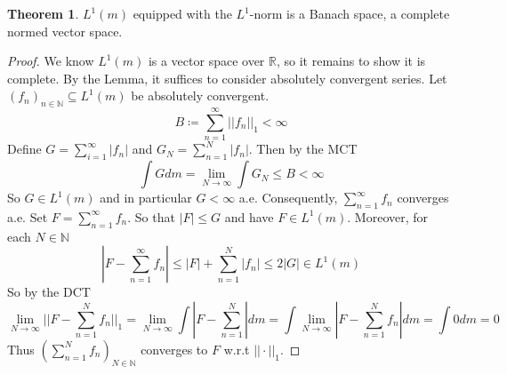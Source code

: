 \documentclass{article}
\theoremstyle{definition}
\newtheorem{theorem}{Theorem}[section]
\theoremstyle{remark}
\theoremstyle{remark}
\def\reals{{\mathbb R}}
\def\naturals{{\mathbb N}}
\begin{document}
\begin{theorem}
$L^1(m)$ equipped with the $L^1$-norm is a Banach space, a complete normed vector space.
\end{theorem}
\begin{proof}
We know $L^1(m)$ is a vector space over $\reals$, so it remains to show it is complete. By the Lemma, it suffices to consider absolutely convergent series. Let $(f_n)_{n\in\naturals}\subseteq L^1(m)$ be absolutely convergent.
 $$B\coloneqq \sum_{n=1}^\infty ||f_n||_1 < \infty$$
 Define $G = \sum_{i=1}^\infty |f_n|$ and $G_N = \sum_{n=1}^N |f_n|$. Then by the MCT
 $$\int G dm = \lim_{N\to\infty} \int G_N \leq B < \infty$$ 
 So $G\in L^1(m)$ and in particular $G < \infty$ a.e. Consequently, $\sum_{n=1}^\infty f_n$ converges a.e. Set $F = \sum_{n=1}^\infty f_n$. So that $|F| \leq G$ and have $F \in L^1(m)$. Moreover, for each $N\in \naturals$
 $$|F - \sum_{n=1}^\infty f_n| \leq |F| + \sum_{n=1}^N |f_n| \leq 2|G| \in L^1(m)$$
 So by the DCT
 $$\lim_{N\to\infty} ||F - \sum_{n=1}^N f_n||_1 = \lim_{N\to\infty} \int |F - \sum_{n=1}^N | dm = \int \lim_{N\to\infty} |F - \sum_{n=1}^N f_n| dm = \int 0 dm = 0$$
 Thus $(\sum_{n=1}^N f_n)_{N\in\naturals}$ converges to $F$ w.r.t $||\cdot||_1$.
\end{proof}
\end{document}
